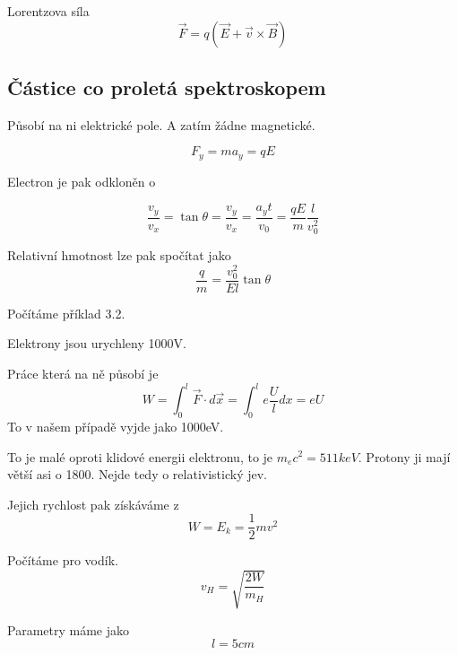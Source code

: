 \documentclass[../main.tex]{subfiles}
\begin{document}
Lorentzova síla
\begin{equation}
    \vec{F} = q(\vec{E} + \vec{v} \times \vec{B})
\end{equation}

\subsection{Částice co proletá spektroskopem}
Působí na ni elektrické pole. A zatím žádne magnetické.

\begin{equation}
    F_y = ma_y = qE 
\end{equation}

Electron je pak odkloněn o 

\begin{equation}
    \frac{v_y}{v_x} = \tan \theta = \frac{v_y}{v_x} = \frac{a_y t}{v_0} = \frac{q E}{m} \frac{l}{v_0^2}
\end{equation}

Relativní hmotnost lze pak spočítat jako 
\begin{equation}
    \frac{q }{m} = \frac{v_0^2}{E l} \tan \theta 
\end{equation}

Počítáme příklad 3.2.

Elektrony jsou urychleny 1000V.

Práce která na ně působí je 
\begin{equation}
    W = \int_{0}^{l} \vec{F}\cdot d\vec{x} = \int_{0}^{l} e \frac{U}{l} dx = e U 
\end{equation}
To v našem případě vyjde jako 1000eV.

\begin{remark}
    To je malé oproti klidové energii elektronu, to je $m_e c^2 = 511 keV$. 
    Protony ji mají větší asi o 1800. 
    Nejde tedy o relativistický jev.
\end{remark}

Jejich rychlost pak získáváme z 
\begin{equation}
    W = E_k = \frac{1}{2} m v^2
\end{equation}

Počítáme pro vodík.
\begin{equation}
    v_H = \sqrt{\frac{2W}{m_H}}
\end{equation}

Parametry máme jako 
\begin{equation}
    l = 5 cm
\end{equation}
\end{document}
